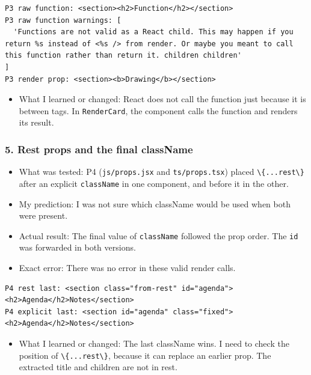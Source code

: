 \documentclass[
  11pt,
]{article}
\newcommand{\passthrough}[1]{#1}
\providecommand{\tightlist}{%
  \setlength{\itemsep}{0pt}\setlength{\parskip}{0pt}}
\begin{document}
\begin{lstlisting}
P3 raw function: <section><h2>Function</h2></section>
P3 raw function warnings: [
  'Functions are not valid as a React child. This may happen if you return %s instead of <%s /> from render. Or maybe you meant to call this function rather than return it. children children'
]
P3 render prop: <section><b>Drawing</b></section>
\end{lstlisting}

\begin{itemize}
\tightlist
\item
  What I learned or changed: React does not call the function just
  because it is between tags. In \passthrough{\lstinline!RenderCard!},
  the component calls the function and renders its result.
\end{itemize}

\subsubsection{5. Rest props and the final
className}\label{rest-props-and-the-final-classname}

\begin{itemize}
\tightlist
\item
  What was tested: P4 (\passthrough{\lstinline!js/props.jsx!} and
  \passthrough{\lstinline!ts/props.tsx!}) placed
  \passthrough{\lstinline!\{...rest\}!} after an explicit
  \passthrough{\lstinline!className!} in one component, and before it in
  the other.
\item
  My prediction: I was not sure which className would be used when both
  were present.
\item
  Actual result: The final value of \passthrough{\lstinline!className!}
  followed the prop order. The \passthrough{\lstinline!id!} was
  forwarded in both versions.
\item
  Exact error: There was no error in these valid render calls.
\end{itemize}

\begin{lstlisting}
P4 rest last: <section class="from-rest" id="agenda"><h2>Agenda</h2>Notes</section>
P4 explicit last: <section id="agenda" class="fixed"><h2>Agenda</h2>Notes</section>
\end{lstlisting}

\begin{itemize}
\tightlist
\item
  What I learned or changed: The last className wins. I need to check
  the position of \passthrough{\lstinline!\{...rest\}!}, because it can
  replace an earlier prop. The extracted title and children are not in
  rest.
\end{itemize}
\end{document}
